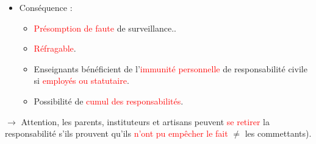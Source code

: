 \begin{itemize}
\begin{itemize}
\begin{itemize}
		\end{itemize}
		\item Conséquence :
		\begin{itemize}
			\item \textcolor{red}{Présomption de faute} de surveillance..
			\item \textcolor{red}{Réfragable}.
			\item Enseignants bénéficient de l'\textcolor{red}{immunité personnelle} de responsabilité civile si \textcolor{red}{employés ou statutaire}.
			\item Possibilité de \textcolor{red}{cumul des responsabilités}.
		\end{itemize}		
	\end{itemize}
	$\rightarrow$ Attention, les parents, instituteurs et artisans peuvent \textcolor{red}{se retirer} la responsabilité s'ils prouvent qu'ils \textcolor{red}{n'ont pu empêcher le fait} $\neq$ les commettants).
\end{itemize}

